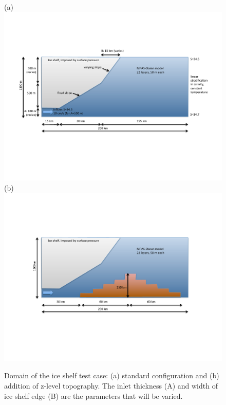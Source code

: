 \documentclass[11pt]{report}
\begin{document}
\begin{figure}[tbh]
\center
(a)\includegraphics[width=6.5in]{f/sub-ice_shelf_diagram1.pdf}\\
\vspace{.2in}
(b)\includegraphics[width=6.8in]{f/sub-ice_shelf_diagram2c.pdf}
\caption{Domain of the ice shelf test case: (a) standard configuration and (b) addition of z-level topography.  The inlet thickness (A) and width of ice shelf edge (B) are the parameters that will be varied.}
\label{figure:ice shelf domain}
\end{figure}
\end{document}
